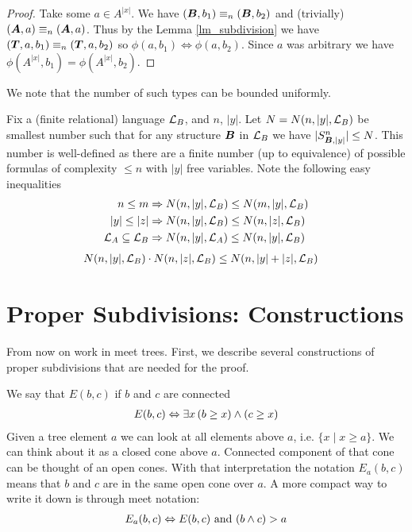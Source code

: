 \documentclass{amsart}
\DeclareMathOperator{\TT}{\boldface T}
\DeclareMathOperator{\A}{\boldface A}
\DeclareMathOperator{\B}{\boldface B}
\begin{document}
\begin{proof}
	Take some $a \in A^{|x|}$. We have $(\B, b_1) \equiv_n (\B, b_2)$ and (trivially) $(\A, a) \equiv_n (\A, a)$. Thus by the Lemma \ref{lm_subdivision} we have $(\TT, a, b_1) \equiv_n (\TT, a, b_2)$ so $\phi(a, b_1) \iff \phi(a, b_2)$. Since $a$ was arbitrary we have $\phi(A^{|x|}, b_1) = \phi(A^{|x|}, b_2)$.
\end{proof}

We note that the number of such types can be bounded uniformly.

\begin{Definition} \label{def_type_count}
	Fix a (finite relational) language $\mathcal L_B$, and $n$, $|y|$. Let $N = N(n, |y|, \mathcal L_B)$ be smallest number such that for any structure $\B$ in $\mathcal L_B$ we have $|S^n_{\B, |y|}| \leq N$. This number is well-defined as there are a finite number (up to equivalence) of possible formulas of complexity $\leq n$ with $|y|$ free variables. Note the following easy inequalities
	\begin{align*}
		n \leq m &\Rightarrow N(n, |y|, \mathcal L_B) \leq N(m, |y|, \mathcal L_B) \\
		|y| \leq |z| &\Rightarrow N(n, |y|, \mathcal L_B) \leq N(n, |z|, \mathcal L_B) \\
		\mathcal L_A \subseteq \mathcal L_B &\Rightarrow N(n, |y|, \mathcal L_A) \leq N(n, |y|, \mathcal L_B)
	\end{align*}
	\begin{align*}
		N(n, |y|, \mathcal L_B) \cdot N(n, |z|, \mathcal L_B) &\leq N(n, |y|+|z|, \mathcal L_B) 
	\end{align*}
\end{Definition}

\section{Proper Subdivisions: Constructions}

From now on work in meet trees. First, we describe several constructions of proper subdivisions that are needed for the proof. 

\begin{Definition}
	We say that $E(b, c)$ if $b$ and $c$ are connected
	\begin{align*}
		E(b, c) \Leftrightarrow \exists x \, (b \geq x) \wedge (c \geq x)
	\end{align*}
	Given a tree element $a$ we can look at all elements above $a$, i.e. $\{x \mid x \geq a\}$. We can think about it as a closed cone above $a$. Connected component of that cone can be thought of an open cones. With that interpretation the notation $E_a(b, c)$ means that $b$ and $c$ are in the same open cone over $a$. A more compact way to write it down is through meet notation:
	\begin{align*}
		E_a(b, c) \Leftrightarrow E(b,c) \text{ and } (b \wedge c) > a
	\end{align*}
\end{Definition}
\end{document}
